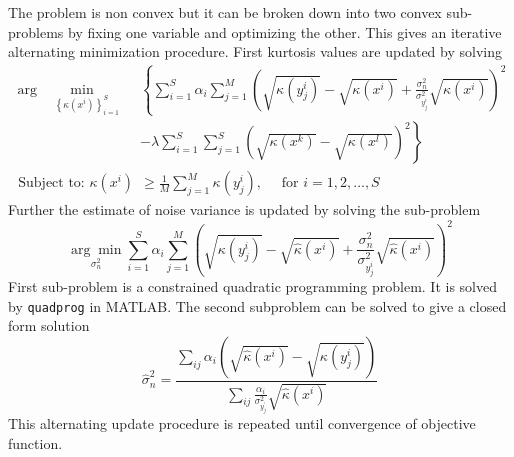 \documentclass[11pt]{article}
\begin{document}
The problem is non convex but it can be broken down into two convex sub-problems by fixing one variable and optimizing the other. This gives an iterative alternating minimization procedure. First kurtosis values are updated by solving
\begin{equation}
\begin{aligned}
\arg \min_{ \quad \left\{ \kappa \left( x ^ { i } \right) \right\} _ { i = 1 } ^ { S }} &  \left\{ \sum _ { i = 1 } ^ { S } \alpha _ { i } \sum _ { j = 1 } ^ { M } \left( \sqrt { \kappa \left( y _ { j } ^ { i } \right) } - \sqrt { \kappa \left( x ^ { i } \right) } +  \frac { \sigma _ { n } ^ { 2 } } { \sigma _ { y _ { j } ^ { i } } ^ { 2 } } \sqrt { \kappa \left( x ^ { i } \right) } \right) ^ { 2 }  \right.  \\
 & \left. - \lambda \sum _ { i = 1 } ^ { S } \sum _ { j = 1 } ^ { S } \left( \sqrt { \kappa \left( x ^ { k } \right) } - \sqrt { \kappa \left( x ^ { l } \right) } \right) ^ { 2 } \right\}  \\
  \text { Subject to: } \kappa \left( x ^ { i } \right) &\geq \frac { 1 } { M } \sum _ { j = 1 } ^ { M } \kappa \left( y _ { j } ^ { i } \right) , \quad \text { for } i = 1,2 , \ldots , S 
 \end{aligned}
 \end{equation}
Further the estimate of noise variance is updated by solving the sub-problem
\begin{equation}
\underset { \sigma _ { n } ^ { 2 } } { \arg \min } \sum _ { i = 1 } ^ { S } \alpha _ { i } \sum _ { j = 1 } ^ { M } \left( \sqrt { \kappa \left( y _ { j } ^ { i } \right) } - \sqrt { \hat { \kappa } \left( x ^ { i } \right) } + \frac { \sigma _ { n } ^ { 2 } } { \sigma _ { y _ { j } ^ { i } } ^ 2} \sqrt { \hat { \kappa } \left( x ^ { i } \right) } \right) ^ { 2 }
\end{equation}
First sub-problem is a constrained quadratic programming problem. It is solved by \texttt{quadprog} in \textsc{MATLAB}. The second subproblem can be solved to give a closed form solution
\begin{equation}\hat { \sigma } _ { n } ^ { 2 } = \frac { \sum _ { i j } \alpha _ { i } \left( \sqrt { \hat { \kappa } \left( x ^ { i } \right) } - \sqrt { \kappa \left( y _ { j } ^ { i } \right) } \right) } { \sum _ { i j } \frac { \alpha _ { i } } { \sigma _ { y _ { j } ^ { \prime } } ^ { 2 } } \sqrt { \hat { \kappa } \left( x ^ { i } \right) } }
\end{equation}
This alternating update procedure is repeated until convergence of objective function.
\end{document}
